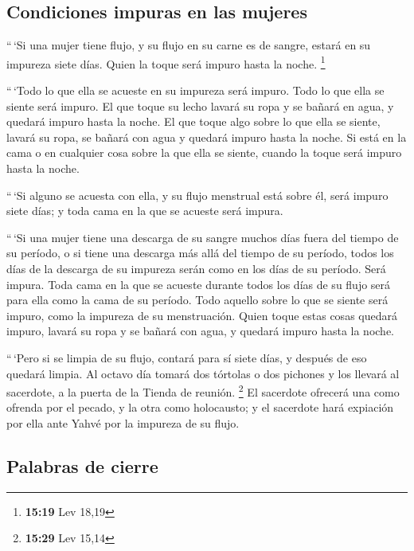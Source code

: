 \hypertarget{condiciones-impuras-en-las-mujeres}{%
\subsection{Condiciones impuras en las
mujeres}\label{condiciones-impuras-en-las-mujeres}}

 ``\,`Si una mujer tiene flujo, y su flujo en su carne es
de sangre, estará en su impureza siete días. Quien la toque será impuro
hasta la noche. \footnote{\textbf{15:19} Lev 18,19}

 ``\,`Todo lo que ella se acueste en su impureza será
impuro. Todo lo que ella se siente será impuro.  El que
toque su lecho lavará su ropa y se bañará en agua, y quedará impuro
hasta la noche.  El que toque algo sobre lo que ella se
siente, lavará su ropa, se bañará con agua y quedará impuro hasta la
noche.  Si está en la cama o en cualquier cosa sobre la
que ella se siente, cuando la toque será impuro hasta la noche.

 ``\,`Si alguno se acuesta con ella, y su flujo menstrual
está sobre él, será impuro siete días; y toda cama en la que se acueste
será impura.

 ``\,`Si una mujer tiene una descarga de su sangre muchos
días fuera del tiempo de su período, o si tiene una descarga más allá
del tiempo de su período, todos los días de la descarga de su impureza
serán como en los días de su período. Será impura.  Toda
cama en la que se acueste durante todos los días de su flujo será para
ella como la cama de su período. Todo aquello sobre lo que se siente
será impuro, como la impureza de su menstruación.  Quien
toque estas cosas quedará impuro, lavará su ropa y se bañará con agua, y
quedará impuro hasta la noche.

 ``\,`Pero si se limpia de su flujo, contará para sí
siete días, y después de eso quedará limpia.  Al octavo
día tomará dos tórtolas o dos pichones y los llevará al sacerdote, a la
puerta de la Tienda de reunión. \footnote{\textbf{15:29} Lev 15,14}
 El sacerdote ofrecerá una como ofrenda por el pecado, y
la otra como holocausto; y el sacerdote hará expiación por ella ante
Yahvé por la impureza de su flujo.

\hypertarget{palabras-de-cierre}{%
\subsection{Palabras de cierre}\label{palabras-de-cierre}}

